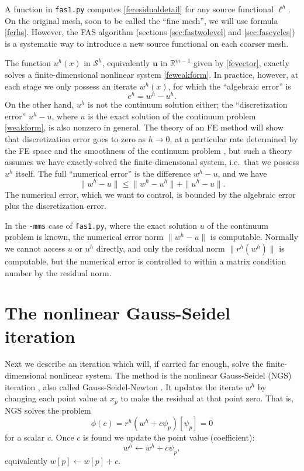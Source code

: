 \documentclass[letterpaper,final,12pt,reqno]{amsart}
\newcommand{\RR}{\mathbb{R}}
\newcommand{\bu}{\mathbf{u}}
\begin{document}
A function in \texttt{fas1.py} computes \eqref{feresidualdetail} for any source functional $\ell^h$.  On the original mesh, soon to be called the ``fine mesh'', we will use formula \eqref{ferhs}.  However, the FAS algorithm (sections \ref{sec:fastwolevel} and \ref{sec:fascycles}) is a systematic way to introduce a new source functional on each coarser mesh.

The function $u^h(x)$ in $\mathcal{S}^h$, equivalently $\bu$ in $\RR^{m-1}$ given by \eqref{fevector}, exactly solves a finite-dimensional nonlinear system \eqref{feweakform}.  In practice, however, at each stage we only possess an iterate $w^h(x)$, for which the ``algebraic error'' is
\begin{equation}
  e^h = w^h - u^h.  \label{feerror}
\end{equation}
On the other hand, $u^h$ is not the continuum solution either; the ``discretization error'' $u^h-u$, where $u$ is the exact solution of the continuum problem \eqref{weakform}, is also nonzero in general.  The theory of an FE method will show that discretization error goes to zero as $h\to 0$, at a particular rate determined by the FE space and the smoothness of the continuum problem \cite{Elmanetal2014}, but such a theory assumes we have exactly-solved the finite-dimensional system, i.e.~that we possess $u^h$ itself.  The full ``numerical error'' is the difference $w^h-u$, and we have
\begin{equation}
\|w^h-u\| \le \|w^h-u^h\|+\|u^h-u\|.
\end{equation}
The numerical error, which we want to control, is bounded by the algebraic error plus the discretization error.

In the \texttt{-mms} case of \texttt{fas1.py}, where the exact solution $u$ of the continuum problem is known, the numerical error norm $\|w^h-u\|$ is computable.  Normally we cannot access $u$ or $u^h$ directly, and only the residual norm $\|r^h(w^h)\|$ is computable, but the numerical error is controlled to within a matrix condition number by the residual norm.


\section{The nonlinear Gauss-Seidel iteration}  \label{sec:ngs}

Next we describe an iteration which will, if carried far enough, solve the finite-dimensional nonlinear system.  The method is the nonlinear Gauss-Seidel (NGS) iteration \cite{Briggsetal2000}, also called Gauss-Seidel-Newton \cite{BrandtLivne2011}.  It updates the iterate $w^h$ by changing each point value at $x_p$ to make the residual at that point zero.  That is, NGS solves the problem
\begin{equation}
\phi(c) = r^h(w^h + c \psi_p)[\psi_p] = 0  \label{ngspointproblem}
\end{equation}
for a scalar $c$.  Once $c$ is found we update the point value (coefficient):
\begin{equation}
  w^h \leftarrow w^h + c \psi_p,  \label{ngspointupdate}
\end{equation}
equivalently $w[p] \leftarrow w[p] + c$.
\end{document}
